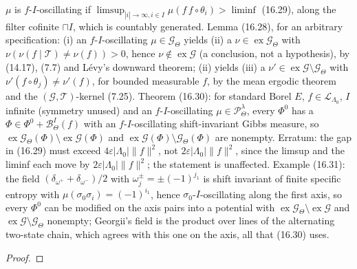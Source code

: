 \begin{theorem}
    $\mu$ is $f$-$I$-oscillating if $\limsup_{|i|\to\infty, i\in I}\mu(f\,f\circ\theta_i) >
    \liminf$ (16.29), along the filter cofinite $\sqcap I$, which is countably generated. Lemma
    (16.28), for an arbitrary specification: (i) an $f$-$I$-oscillating
    $\mu \in \mathcal G_\Theta$ yields (ii) a $\nu \in \operatorname{ex}\mathcal G_\Theta$ with
    $\nu(\nu(f\mid\mathcal T) \neq \nu(f)) > 0$, hence $\nu \notin \operatorname{ex}\mathcal G$
    (a conclusion, not a hypothesis), by (14.17), (7.7) and L\'evy's downward theorem; (ii) yields
    (iii) a $\nu' \in \operatorname{ex}\mathcal G \setminus \mathcal G_\Theta$ with
    $\nu'(f\circ\theta_j) \neq \nu'(f)$, for bounded measurable $f$, by the mean ergodic theorem
    and the $(\mathcal G,\mathcal T)$-kernel (7.25). Theorem (16.30): for standard Borel $E$,
    $f \in \mathcal L_{\Lambda_0}$, $I$ infinite (symmetry unused) and an $f$-$I$-oscillating
    $\mu \in \mathcal P^\lambda_\Theta$, every $\Phi^0$ has a $\Phi \in \Phi^0 +
    \mathcal B^I_\Theta(f)$ with an $f$-$I$-oscillating shift-invariant Gibbs measure, so
    $\operatorname{ex}\mathcal G_\Theta(\Phi) \setminus \operatorname{ex}\mathcal G(\Phi)$ and
    $\operatorname{ex}\mathcal G(\Phi) \setminus \mathcal G_\Theta(\Phi)$ are nonempty. Erratum:
    the gap in (16.29) must exceed $4\varepsilon|\Lambda_0|\|f\|^2$, not $2\varepsilon|\Lambda_0|\|f\|^2$,
    since the limsup and the liminf each move by $2\varepsilon|\Lambda_0|\|f\|^2$; the statement
    is unaffected. Example (16.31): the field $(\delta_{\omega^+} + \delta_{\omega^-})/2$ with
    $\omega^\pm_j = \pm(-1)^{j_1}$ is shift invariant of finite specific entropy with
    $\mu(\sigma_0\sigma_i) = (-1)^{i_1}$, hence $\sigma_0$-$I$-oscillating along the first axis, so
    every $\Phi^0$ can be modified on the axis pairs into a potential with
    $\operatorname{ex}\mathcal G_\Theta \setminus \operatorname{ex}\mathcal G$ and
    $\operatorname{ex}\mathcal G \setminus \mathcal G_\Theta$ nonempty; Georgii's field is the
    product over lines of the alternating two-state chain, which agrees with this one on the axis,
    all that (16.30) uses.
\end{theorem}
\begin{proof}
    \leanok
\end{proof}


